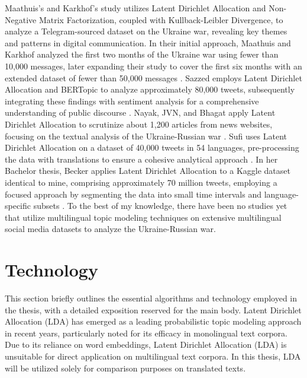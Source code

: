\documentclass[
    11pt,
    a4paper,
    egregdoesnotlikesansseriftitles,
    toc=chapterentrywithdots,
    oneside,openright,
    titlepage,
    parskip=half,
    headings=normal,  %
    listof=totoc,
    bibliography=totoc,
    index=totoc,
    captions=tableheading,  %
    chapterprefix,
    listof=flat,
    final
]{scrbook}
\begin{document}
Maathuis's and Karkhof's study utilizes Latent Dirichlet Allocation and Non-Negative Matrix Factorization, coupled with Kullback-Leibler Divergence, to analyze a Telegram-sourced dataset on the Ukraine war, revealing key themes and patterns in digital communication.
In their initial approach, Maathuis and Karkhof analyzed the first two months of the Ukraine war using fewer than 10,000 messages, later expanding their study to cover the first six months with an extended dataset of fewer than 50,000 messages \cite{TopicModellingTelegram1,TopicModellingTelegram2}. 
Sazzed employs Latent Dirichlet Allocation and BERTopic to analyze approximately 80,000 tweets, subsequently integrating these findings with sentiment analysis for a comprehensive understanding of public discourse \cite{TopicTwitterLDABERt}. 
Nayak, JVN, and Bhagat apply Latent Dirichlet Allocation to scrutinize about 1,200 articles from news websites, focusing on the textual analysis of the Ukraine-Russian war \cite{TopicModelingconflig}.
Sufi uses Latent Dirichlet Allocation on a dataset of 40,000 tweets in 54 languages, pre-processing the data with translations to ensure a cohesive analytical approach \cite{SocialMediaanalysis}.
In her Bachelor thesis, Becker applies Latent Dirichlet Allocation to a Kaggle dataset identical to mine, comprising approximately 70 million tweets, employing a focused approach by segmenting the data into small time intervals and language-specific subsets \cite{Ivanna}.
To the best of my knowledge, there have been no studies yet that utilize multilingual topic modeling techniques on extensive multilingual social media datasets to analyze the Ukraine-Russian war.



{\let\clearpage\relax \chapter{Technology}}
This section briefly outlines the essential algorithms and technology employed in the thesis, with a detailed exposition reserved for the main body.
Latent Dirichlet Allocation (LDA)  \cite{LDA} has emerged as a leading probabilistic topic modeling approach in recent years, particularly noted for its efficacy in monolingual text corpora. Due to its reliance on word embeddings, Latent Dirichlet Allocation (LDA) is unsuitable for direct application on multilingual text corpora. In this thesis, LDA will be utilized solely for comparison purposes on translated texts.
\end{document}
